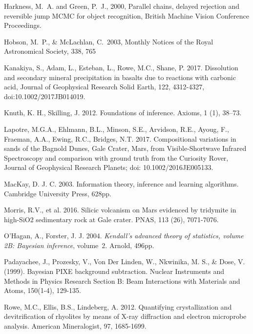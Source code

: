\documentclass[review]{elsarticle}
\newcommand{\mnras}{Monthly Notices of the Royal Astronomical Society}
\newcommand{\changed}{\color{blue}}
\begin{document}
\begin{thebibliography}{99}
{\changed 
{} Harkness, M.~A. and Green, P.~J., 2000,
Parallel chains, delayed rejection and reversible jump MCMC for object recognition,
British Machine Vision Conference Proceedings.
}

{\changed 
{} Hobson, M.~P., \& McLachlan, C.\ 2003, \mnras, 338, 765 
}

Kanakiya, S., Adam, L., Esteban, L., Rowe, M.C., Shane, P. 2017. Dissolution and secondary mineral precipitation in basalts due to reactions with carbonic acid, Journal of Geophysical Research Solid Earth, 122, 4312-4327, doi:10.1002/2017JB014019.

Knuth, K. H., Skilling, J. 2012.
\newblock Foundations of inference.
\newblock Axioms, 1 (1),  38--73.

Lapotre, M.G.A., Ehlmann, B.L., Minson, S.E., Arvidson, R.E., Ayoug, F., Fraeman, A.A., Ewing, R.C., Bridges, N.T. 2017. Compositional variations in sands of the Bagnold Dunes, Gale Crater, Mars, from Visible-Shortwave Infrared Spectroscopy and comparison with ground truth from the Curiosity Rover, Journal of Geophysical Research Planets; doi: 10.1002/2016JE005133.

MacKay, D. J. C. 2003. Information theory, inference and learning algorithms. Cambridge University Press, 628pp.

Morris, R.V., et al. 2016. Silicic volcanism on Mars evidenced by tridymite in high-SiO2 sedimentary rock at Gale crater. PNAS, 113 (26), 7071-7076.

O'Hagan, A., Forster, J. J. 2004.
\newblock \emph{Kendall's advanced theory of statistics, volume 2B: Bayesian
  inference}, volume~2.
\newblock Arnold, 496pp.

{\changed 
{}
Padayachee, J., Prozesky, V., Von Der Linden, W., Nkwinika, M. S., \& Dose, V. (1999). Bayesian PIXE background subtraction. Nuclear Instruments and Methods in Physics Research Section B: Beam Interactions with Materials and Atoms, 150(1-4), 129-135.
}

Rowe, M.C., Ellis, B.S., Lindeberg, A. 2012. Quantifying crystallization and devitrification of rhyolites by means of X-ray diffraction and electron microprobe analysis. American Mineralogist, 97, 1685-1699.


\end{thebibliography}
\end{document}
